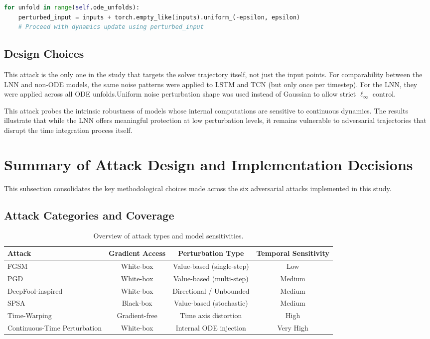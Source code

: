 \begin{lstlisting}[language=Python, caption={Continuous-Time Perturbation Injection}]
for unfold in range(self.ode_unfolds):
    perturbed_input = inputs + torch.empty_like(inputs).uniform_(-epsilon, epsilon)
    # Proceed with dynamics update using perturbed_input
\end{lstlisting}

\subsection*{Design Choices}
This attack is the only one in the study that targets the solver trajectory itself, not just the input points. For comparability between the LNN and non-ODE models, the same noise patterns were applied to LSTM and TCN (but only once per timestep). For the LNN, they were applied across all ODE unfolds.Uniform noise perturbation shape was used instead of Gaussian to allow strict $\ell_\infty$ control.

This attack probes the intrinsic robustness of models whose internal computations are sensitive to continuous dynamics. The results illustrate that while the LNN offers meaningful protection at low perturbation levels, it remains vulnerable to adversarial trajectories that disrupt the time integration process itself.

\section{Summary of Attack Design and Implementation Decisions}

This subsection consolidates the key methodological choices made across the six adversarial attacks implemented in this study.

\subsection*{Attack Categories and Coverage}
\begin{table}[H]
\centering
\begin{tabular}{|l|c|c|c|}
\hline
\textbf{Attack} & \textbf{Gradient Access} & \textbf{Perturbation Type} & \textbf{Temporal Sensitivity} \\
\hline
FGSM & White-box & Value-based (single-step) & Low \\
PGD & White-box & Value-based (multi-step) & Medium \\
DeepFool-inspired & White-box & Directional / Unbounded & Medium \\
SPSA & Black-box & Value-based (stochastic) & Medium \\
Time-Warping & Gradient-free & Time axis distortion & High \\
Continuous-Time Perturbation & White-box & Internal ODE injection & Very High \\
\hline
\end{tabular}
\caption{Overview of attack types and model sensitivities.}
\label{tab:attack_summary}
\end{table}


